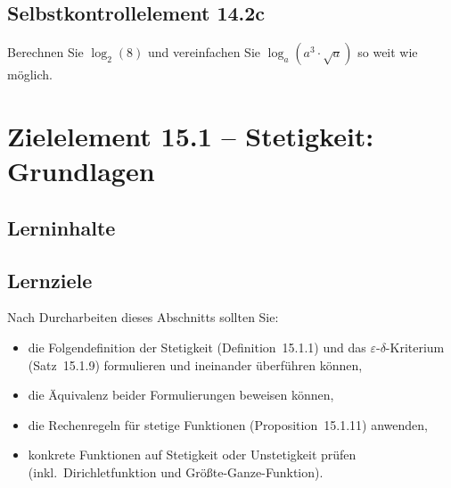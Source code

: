 \documentclass[a4paper,12pt]{article}
\begin{document}
\subsection*{Selbstkontrollelement 14.2c}

Berechnen Sie $\log_2(8)$ und vereinfachen Sie $\log_a(a^3 \cdot \sqrt{a})$ so
weit wie möglich.

\newpage

\section*{Zielelement 15.1 -- Stetigkeit: Grundlagen}

\subsection*{Lerninhalte}

\begin{center}
\end{center}

\subsection*{Lernziele}

Nach Durcharbeiten dieses Abschnitts sollten Sie:
\begin{itemize}
  \item die Folgendefinition der Stetigkeit (Definition~15.1.1) und das
        $\varepsilon$-$\delta$-Kriterium (Satz~15.1.9) formulieren und ineinander
        überführen können,
  \item die Äquivalenz beider Formulierungen beweisen können,
  \item die Rechenregeln für stetige Funktionen (Proposition~15.1.11) anwenden,
  \item konkrete Funktionen auf Stetigkeit oder Unstetigkeit prüfen (inkl.\
        Dirichletfunktion und Größte-Ganze-Funktion).
\end{itemize}
\end{document}
